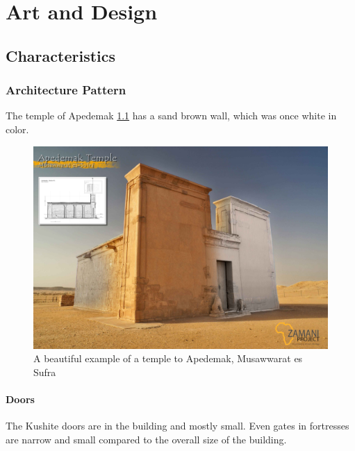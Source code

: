 \documentclass[a4paper,12pt]{scrreprt}
\begin{document}
\chapter{Art and Design}

\section{Characteristics}

\subsection{Architecture Pattern}

The temple of Apedemak \ref{fig:apedemak-temple} has a sand brown wall, which was once white in color.

\begin{figure}[H]
	\centering
	\includegraphics[width=\textwidth]{img/temple/apedemak_temple}
	\caption{A beautiful example of a temple to Apedemak, Musawwarat es Sufra}\label{fig:apedemak-temple}
\end{figure}

\subsubsection{Doors}

The Kushite doors are in the building and mostly small. Even gates in fortresses are narrow and small compared to the overall size of the building.  
\end{document}
